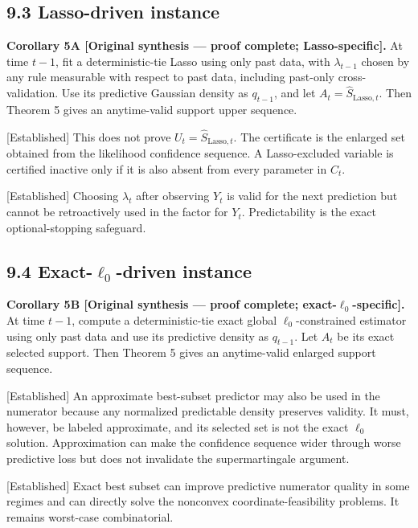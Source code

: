 \documentclass[
  english,
  11pt,
  a4paper,
]{article}
\begin{document}
\subsection{9.3 Lasso-driven instance}\label{lasso-driven-instance}

\textbf{Corollary 5A {[}Original synthesis --- proof complete;
Lasso-specific{]}.} At time $t-1$, fit a deterministic-tie Lasso using
only past data, with $\lambda_{t-1}$ chosen by any rule measurable
with respect to past data, including past-only cross-validation. Use its
predictive Gaussian density as $q_{t-1}$, and let
$A_t=\widehat S_{\mathrm{Lasso},t}$. Then Theorem 5 gives an
anytime-valid support upper sequence.

{[}Established{]} This does not prove
$U_t=\widehat S_{\mathrm{Lasso},t}$. The certificate is the enlarged
set obtained from the likelihood confidence sequence. A Lasso-excluded
variable is certified inactive only if it is also absent from every
parameter in $C_t$.

{[}Established{]} Choosing $\lambda_t$ after observing $Y_t$ is
valid for the next prediction but cannot be retroactively used in the
factor for $Y_t$. Predictability is the exact optional-stopping
safeguard.

\subsection{\texorpdfstring{9.4 Exact-$\ell_0$-driven
instance}{9.4 Exact-\textbackslash ell\_0-driven instance}}\label{exact-ell_0-driven-instance}

\textbf{Corollary 5B {[}Original synthesis --- proof complete;
exact-$\ell_0$-specific{]}.} At time $t-1$, compute a
deterministic-tie exact global $\ell_0$-constrained estimator using
only past data and use its predictive density as $q_{t-1}$. Let
$A_t$ be its exact selected support. Then Theorem 5 gives an
anytime-valid enlarged support sequence.

{[}Established{]} An approximate best-subset predictor may also be used
in the numerator because any normalized predictable density preserves
validity. It must, however, be labeled approximate, and its selected set
is not the exact $\ell_0$ solution. Approximation can make the
confidence sequence wider through worse predictive loss but does not
invalidate the supermartingale argument.

{[}Established{]} Exact best subset can improve predictive numerator
quality in some regimes and can directly solve the nonconvex
coordinate-feasibility problems. It remains worst-case combinatorial.
\end{document}
